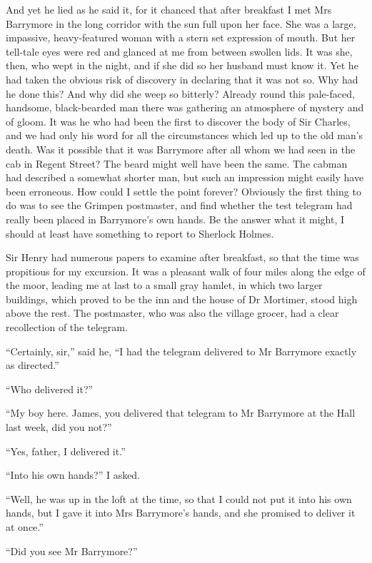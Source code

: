 \documentclass[paper=a5,BCOR=7mm,twoside,DIV=calc,12pt,usegeometry,openany,chapterprefix,endperiod,headings=big]{scrbook} %
\begin{document}
And yet he lied as he said it, for it chanced that after breakfast I met Mrs Barrymore in the long corridor with the sun full upon her face. She was a large, impassive, heavy-featured woman with a stern set expression of mouth. But her tell-tale eyes were red and glanced at me from between swollen lids. It was she, then, who wept in the night, and if she did so her husband must know it. Yet he had taken the obvious risk of discovery in declaring that it was not so. Why had he done this? And why did she weep so bitterly? Already round this pale-faced, handsome, black-bearded man there was gathering an atmosphere of mystery and of gloom. It was he who had been the first to discover the body of Sir Charles, and we had only his word for all the circumstances which led up to the old man's death. Was it possible that it was Barrymore after all whom we had seen in the cab in Regent Street? The beard might well have been the same. The cabman had described a somewhat shorter man, but such an impression might easily have been erroneous. How could I settle the point forever? Obviously the first thing to do was to see the Grimpen postmaster, and find whether the test telegram had really been placed in Barrymore's own hands. Be the answer what it might, I should at least have something to report to Sherlock Holmes.

Sir Henry had numerous papers to examine after breakfast, so that the time was propitious for my excursion. It was a pleasant walk of four miles along the edge of the moor, leading me at last to a small gray hamlet, in which two larger buildings, which proved to be the inn and the house of Dr Mortimer, stood high above the rest. The postmaster, who was also the village grocer, had a clear recollection of the telegram.

\enquote{Certainly, sir,} said he, \enquote{I had the telegram delivered to Mr Barrymore exactly as directed.}

\enquote{Who delivered it?}

\enquote{My boy here. James, you delivered that telegram to Mr Barrymore at the Hall last week, did you not?}

\enquote{Yes, father, I delivered it.}

\enquote{Into his own hands?} I asked.

\enquote{Well, he was up in the loft at the time, so that I could not put it into his own hands, but I gave it into Mrs Barrymore's hands, and she promised to deliver it at once.}

\enquote{Did you see Mr Barrymore?}
\end{document}
